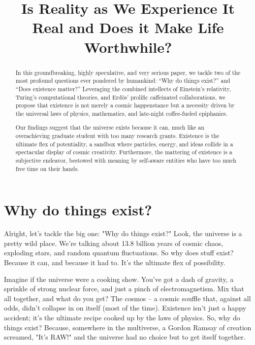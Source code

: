 \documentclass{Axon}
\title{Is Reality as We Experience It Real and Does it Make Life Worthwhile?}
\begin{document}
\maketitle
\makeauthor
\begin{abstract}
In this groundbreaking, highly speculative, and very serious paper, we tackle two of the most profound questions ever pondered by humankind: “Why do things exist?” and “Does existence matter?” Leveraging the combined intellects of Einstein’s relativity, Turing’s computational theories, and Erdös’ prolific caffeinated collaborations, we propose that existence is not merely a cosmic happenstance but a necessity driven by the universal laws of physics, mathematics, and late-night coffee-fueled epiphanies.

Our findings suggest that the universe exists because it can, much like an overachieving graduate student with too many research grants. Existence is the ultimate flex of potentiality, a sandbox where particles, energy, and ideas collide in a spectacular display of cosmic creativity. Furthermore, the mattering of existence is a subjective endeavor, bestowed with meaning by self-aware entities who have too much free time on their hands.
\end{abstract}
\section{Why do things exist?}
Alright, let's tackle the big one: "Why do things exist?" Look, the universe is a pretty wild place. We're talking about 13.8 billion years of cosmic chaos, exploding stars, and random quantum fluctuations. So why does stuff exist? Because it can, and because it had to. It's the ultimate flex of possibility.

\begin{example}
    Imagine if the universe were a cooking show. You've got a dash of gravity, a sprinkle of strong nuclear force, and just a pinch of electromagnetism. Mix that all together, and what do you get? The cosmos – a cosmic souffle that, against all odds, didn't collapse in on itself (most of the time). Existence isn't just a happy accident; it’s the ultimate recipe cooked up by the laws of physics. So, why do things exist? Because, somewhere in the multiverse, a Gordon Ramsay of creation screamed, "It’s RAW!" and the universe had no choice but to get itself together.
\end{example}
\end{document}
